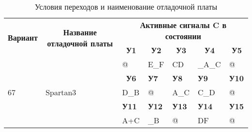 \documentclass[a4paper, 14pt]{article}
\begin{document}
    \begin{table}[H]
        \caption{Условия переходов и наименование отладочной платы}  
        \begin{tabular}{|l|l|l|l|l|l|l|}
            \hline
            \multicolumn{1}{|c|}{\multirow{2}{*}{\textbf{Вариант}}} & \multicolumn{1}{c|}{\multirow{2}{*}{\textbf{Название отладочной платы}}} & \multicolumn{5}{c|}{\textbf{Активные сигналы C в состоянии}}                                                                                                                 \\ \cline{3-7} 
            \multicolumn{1}{|c|}{}                                  & \multicolumn{1}{c|}{}                                                    & \multicolumn{1}{c|}{\textbf{У1}} & \multicolumn{1}{c|}{\textbf{У2}} & \multicolumn{1}{c|}{\textbf{У3}} & \multicolumn{1}{c|}{\textbf{У4}} & \multicolumn{1}{c|}{\textbf{У5}} \\ \hline
            \multirow{5}{*}{67}                                     & \multirow{5}{*}{Spartan3}                                                & @                                & E\_F                             & CD                               & \_A\_C                           & @                                \\ \cline{3-7} 
                                                                    &                                                                          & \multicolumn{1}{c|}{\textbf{У6}} & \textbf{У7}                      & \textbf{У8}                      & \textbf{У9}                      & \textbf{У10}                     \\ \cline{3-7} 
                                                                    &                                                                          & D\_B                             & @                                & A\_C                              & C\_D                            & @                                \\ \cline{3-7} 
                                                                    &                                                                          & \textbf{У11}                     & \textbf{У12}                     & \textbf{У13}                     & \textbf{У14}                     & \textbf{У15}                     \\ \cline{3-7} 
                                                                    &                                                                          & A+C                              & \_B                               & @                                & DF                            & @                              \\ \hline
            \end{tabular}  
    \end{table}
    
\end{document}
